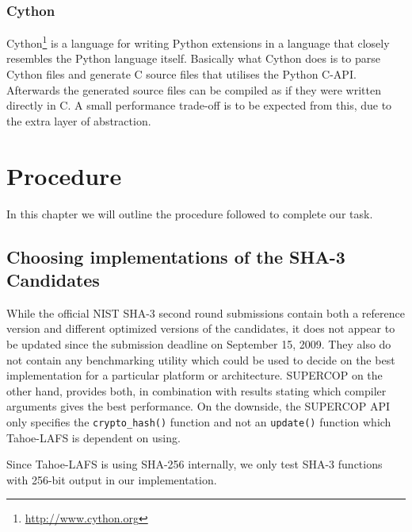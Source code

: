 \documentclass[english,12pt,a4paper]{book}
\begin{document}
\subsection{Cython}
Cython\footnote{\url{http://www.cython.org}} is a language for writing Python
extensions in a language that closely resembles the Python language itself.
Basically what Cython does is to parse Cython files and generate C source files
that utilises the Python C-API. Afterwards the generated source files can be
compiled as if they were written directly in C. A small performance trade-off is
to be expected from this, due to the extra layer of abstraction.

\chapter{Procedure}

%

In this chapter we will outline the procedure followed to complete our task.

\section{Choosing implementations of the SHA-3 Candidates}

While the official \ac{NIST} \ac{SHA}-3 second round submissions contain both
a reference version and different optimized versions of the candidates, it does not
appear to be updated since the submission deadline on September 15, 2009. They
also do not contain any benchmarking utility which could be used to decide on
the best implementation for a particular platform or architecture. \ac{SUPERCOP}
on the other hand, provides both, in combination with results stating which
compiler arguments gives the best performance. On the downside, the
\ac{SUPERCOP} \ac{API} only specifies the \texttt{crypto\_hash()} function and
not an \texttt{update()} function which Tahoe-\ac{LAFS} is dependent on using.

Since Tahoe-\ac{LAFS} is using \ac{SHA}-256 internally, we only test \ac{SHA}-3
functions with 256-bit output in our implementation. 
\end{document}
